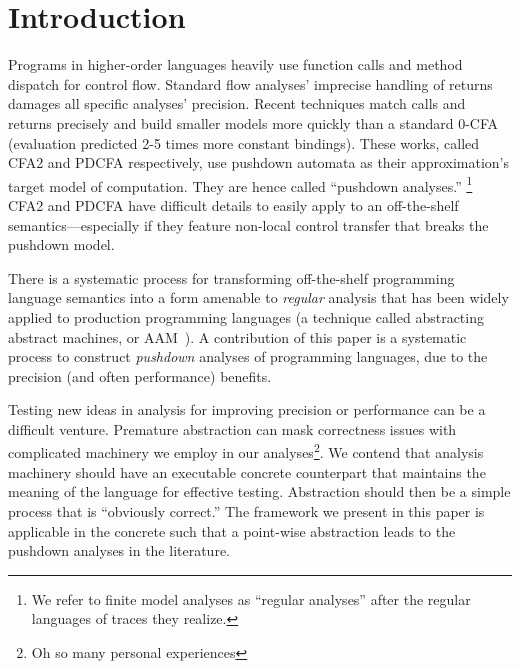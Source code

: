 
\section{Introduction}

Programs in higher-order languages heavily use function calls and method dispatch for control flow.
%
Standard flow analyses' imprecise handling of returns damages all specific analyses' precision.
%
Recent techniques match calls and returns precisely \citep{ianjohnson:vardoulakis-lmcs11, dvanhorn:Earl2010Pushdown} and build smaller models more quickly than a standard 0-CFA (evaluation predicted 2-5 times more constant bindings).
%
These works, called CFA2 and PDCFA respectively, use pushdown automata as their approximation's target model of computation.
%
They are hence called ``pushdown analyses.''%
%
\footnote{We refer to finite model analyses as ``regular analyses'' after the regular languages of traces they realize.}
%
CFA2 and PDCFA have difficult details to easily apply to an off-the-shelf semantics---especially if they feature non-local control transfer that breaks the pushdown model.

There is a systematic process for transforming off-the-shelf programming language semantics into a form amenable to \emph{regular} analysis that has been widely applied to production programming languages (a technique called abstracting abstract machines, or AAM~\citep{dvanhorn:VanHorn2010Abstracting}).
%
A contribution of this paper is a systematic process to construct \emph{pushdown} analyses of programming languages, due to the precision (and often performance) benefits.
%


Testing new ideas in analysis for improving precision or performance can be a difficult venture.
%
Premature abstraction can mask correctness issues with complicated machinery we employ in our analyses\footnote{Oh so many personal experiences}.
%
We contend that analysis machinery should have an executable concrete counterpart that maintains the meaning of the language for effective testing.
%
Abstraction should then be a simple process that is ``obviously correct.''
%
The framework we present in this paper is applicable in the concrete such that a point-wise abstraction leads to the pushdown analyses in the literature.

